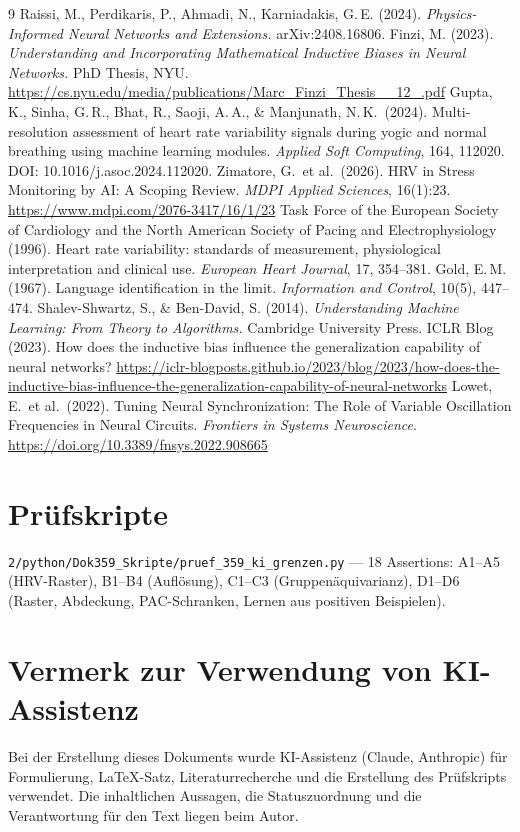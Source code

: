 \begin{thebibliography}{9}
  Raissi, M., Perdikaris, P., Ahmadi, N., Karniadakis, G.\,E. (2024).
  \emph{Physics-Informed Neural Networks and Extensions.}
  arXiv:2408.16806.
  Finzi, M. (2023).
  \emph{Understanding and Incorporating Mathematical Inductive Biases
  in Neural Networks.} PhD Thesis, NYU.
  \url{https://cs.nyu.edu/media/publications/Marc_Finzi_Thesis__12_.pdf}
  Gupta, K., Sinha, G.\,R., Bhat, R., Saoji, A.\,A., \& Manjunath, N.\,K.\ (2024).
  Multi-resolution assessment of heart rate variability signals during
  yogic and normal breathing using machine learning modules.
  \emph{Applied Soft Computing}, 164, 112020.
  DOI: 10.1016/j.asoc.2024.112020.
  Zimatore, G.\ et al.\ (2026).
  HRV in Stress Monitoring by AI: A Scoping Review.
  \emph{MDPI Applied Sciences}, 16(1):23.
  \url{https://www.mdpi.com/2076-3417/16/1/23}
  Task Force of the European Society of Cardiology and the North American
  Society of Pacing and Electrophysiology (1996).
  Heart rate variability: standards of measurement, physiological
  interpretation and clinical use.
  \emph{European Heart Journal}, 17, 354--381.
  Gold, E.\,M. (1967).
  Language identification in the limit.
  \emph{Information and Control}, 10(5), 447--474.
  Shalev-Shwartz, S., \& Ben-David, S. (2014).
  \emph{Understanding Machine Learning: From Theory to Algorithms.}
  Cambridge University Press.
  ICLR Blog (2023).
  How does the inductive bias influence the generalization capability
  of neural networks?
  \url{https://iclr-blogposts.github.io/2023/blog/2023/how-does-the-inductive-bias-influence-the-generalization-capability-of-neural-networks}
  Lowet, E.\ et al.\ (2022).
  Tuning Neural Synchronization: The Role of Variable Oscillation
  Frequencies in Neural Circuits.
  \emph{Frontiers in Systems Neuroscience}.
  \url{https://doi.org/10.3389/fnsys.2022.908665}
\end{thebibliography}

\section*{Prüfskripte}

\texttt{2/python/Dok359\_Skripte/pruef\_359\_ki\_grenzen.py} ---
18 Assertions: A1--A5 (HRV-Raster), B1--B4 (Auflösung), C1--C3
(Gruppenäquivarianz), D1--D6 (Raster, Abdeckung, PAC-Schranken,
Lernen aus positiven Beispielen).

\section*{Vermerk zur Verwendung von KI-Assistenz}

Bei der Erstellung dieses Dokuments wurde KI-Assistenz (Claude, Anthropic)
für Formulierung, LaTeX-Satz, Literaturrecherche und die Erstellung des
Prüfskripts verwendet. Die inhaltlichen Aussagen, die Statuszuordnung
und die Verantwortung für den Text liegen beim Autor.
